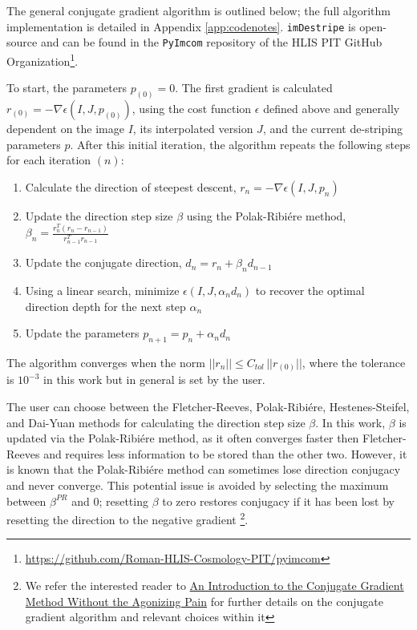 \documentclass[12pt]{pasj01}
\begin{document}
The general conjugate gradient algorithm is outlined below; the full algorithm implementation is detailed in Appendix \ref{app:codenotes}. \texttt{imDestripe} is open-source and can be found in the \texttt{PyImcom} repository of the HLIS PIT GitHub Organization\footnote{\href{https://github.com/Roman-HLIS-Cosmology-PIT/pyimcom}{https://github.com/Roman-HLIS-Cosmology-PIT/pyimcom}}.

To start, the parameters $p_{(0)}=0$. The first gradient is calculated $r_{(0)}=-\nabla\epsilon(I, J, p_{(0)})$, using the cost function $\epsilon$ defined above and generally dependent on the image $I$, its interpolated version $J$, and the current de-striping parameters $p$. After this initial iteration, the algorithm repeats the following steps for each iteration $(n)$:

\begin{enumerate}
    \item Calculate the direction of steepest descent, $r_n = -\nabla\epsilon(I, J, p_n)$
    \item Update the direction step size $\beta$ using the Polak-Ribiére method, $\beta_{n} = \frac{r_{n}^T(r_{n}-r_{n-1})}{r^T_{n-1} r_{n-1}}$
    \item Update the conjugate direction, $d_n = r_n + \beta_n d_{n-1}$
    \item Using a linear search, minimize $\epsilon(I, J,\alpha_nd_n)$ to recover the optimal direction depth for the next step $\alpha_n$
    \item Update the parameters $p_{n+1} = p_n + \alpha_nd_n$
\end{enumerate}

The algorithm converges when the norm $||r_n|| \leq C_{tol}\,||r_{(0)}||$, where the tolerance is $10^{-3}$ in this work but in general is set by the user. 

The user can choose between the Fletcher-Reeves, Polak-Ribiére, Hestenes-Steifel, and Dai-Yuan methods for calculating the direction step size $\beta$. In this work, $\beta$ is updated via the Polak-Ribiére method, as it often converges faster then Fletcher-Reeves and requires less information to be stored than the other two. However, it is known that the Polak-Ribiére method can sometimes lose direction conjugacy and never converge. This potential issue is avoided by selecting the maximum between $\beta^{PR}$ and $0$; resetting $\beta$ to zero restores conjugacy if it has been lost by resetting the direction to the negative gradient \footnote{We refer the interested reader to \href{https://www.cs.cmu.edu/~quake-papers/painless-conjugate-gradient.pdf}{An Introduction to the Conjugate Gradient Method Without the Agonizing Pain} for further details on the conjugate gradient algorithm and relevant choices within it}.
\end{document}
